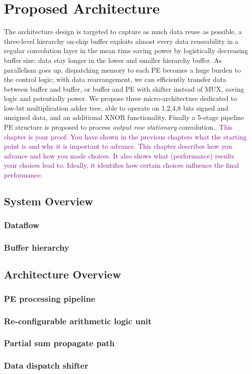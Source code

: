 \chapter{Proposed Architecture}
\label{ch:arch}
The architecture design is targeted to capture as much data reuse as possible, a three-level hierarchy on-chip buffer exploits almost every data reuseability in a regular convolution layer in the mean time saving power by logistically decreasing buffer size: data stay longer in the lower and smaller hierarchy buffer. As parallelism goes up, dispatching memory to each PE becomes a huge burden to the control logic; with data rearrangement, we can efficiently transfer data between buffer and buffer, or buffer and PE with shifter instead of MUX, saving logic and potentially power. We propose three micro-architecture dedicated to low-bit multiplication adder tree, able to operate on 1,2,4,8 bits signed and unsigned data, and an additional XNOR functionality. Finally a 5-stage pipeline PE structure is proposed to process \textit{output row stationary} convolution..
\textcolor{purple}{This chapter is your proof. You have shown in the previous chapters what the starting point is and why it is important to advance. This chapter describes how you advance and how you made choices. It also shows what (performance) results your choices lead to. Ideally, it identifies how certain choices influence the final performance.}
\section{System Overview}
\subsection{Dataflow}
\subsection{Buffer hierarchy}
\section{Architecture Overview}
\subsection{PE processing pipeline}
\subsection{Re-configurable arithmetic logic unit}
\subsection{Partial sum propagate path}
\subsection{Data dispatch shifter}
